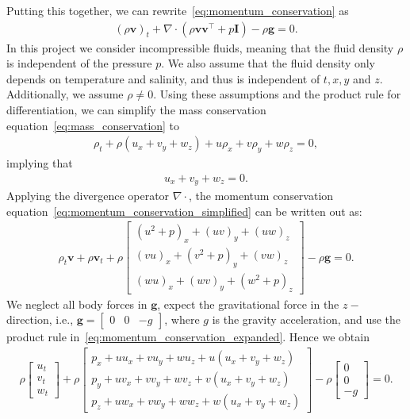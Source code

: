 Putting this together, we can rewrite~\eqref{eq:momentum_conservation} as
\begin{align}\label{eq:momentum_conservation_simplified}
    {(\rho \mathbf{v})}_t + \nabla \cdot (\rho \mathbf{v} \mathbf{v}^\top  + p \mathbf{I}) - \rho \mathbf{g} = 0.
\end{align}
In this project we consider incompressible fluids, meaning that the fluid density $\rho$ is independent of the pressure $p$.
We also assume that the fluid density only depends on temperature and salinity, and thus is independent of $t, x, y$ and $z$.
Additionally, we assume $\rho \neq 0$.
Using these assumptions and the product rule for differentiation, we can simplify the mass conservation equation~\eqref{eq:mass_conservation} to
\begin{align*}
    \rho_t + \rho(u_x + v_y + w_z) + u \rho_x + v \rho_y + w \rho_z = 0,
\end{align*}
implying that
\begin{align}
    u_x + v_y + w_z = 0. \label{eq:mass_conservation_incompressible}
\end{align}
Applying the divergence operator $\nabla \cdot$, the momentum conservation equation~\eqref{eq:momentum_conservation_simplified} can be written out as:
\begin{align}\label{eq:momentum_conservation_expanded}
    \rho_t \mathbf{v} + \rho \mathbf{v}_t + \rho \begin{bmatrix}
        {(u^2 + p)}_x + {(uv)}_y + {(uw)}_z \\
        {(vu)}_x + {(v^2 + p)}_y + {(vw)}_z \\
        {(wu)}_x + {(wv)}_y + {(w^2 + p)}_z 
    \end{bmatrix}
    - \rho \mathbf{g} = 0.
\end{align}
We neglect all body forces in $\mathbf{g}$, expect the gravitational force in the $z-$direction, i.e., $\mathbf{g} = \begin{bmatrix} 0 & 0 & -g \end{bmatrix}$, where $g$ is the gravity acceleration, and use the product rule in~\eqref{eq:momentum_conservation_expanded}.
Hence we obtain
\begin{align}\label{eq:momentum_conservation_expanded_final}
    \rho \begin{bmatrix}
        u_t \\ v_t \\ w_t
    \end{bmatrix}
    + \rho \begin{bmatrix}
        p_x + u u_x + v u_y + w u_z + u(u_x + v_y + w_z) \\
        p_y + u v_x + v v_y + w v_z + v(u_x + v_y + w_z) \\
        p_z + u w_x + v w_y + w w_z + w(u_x + v_y + w_z) 
    \end{bmatrix}
    - \rho \begin{bmatrix}
        0 \\ 0 \\ -g
    \end{bmatrix} = 0.
\end{align}
